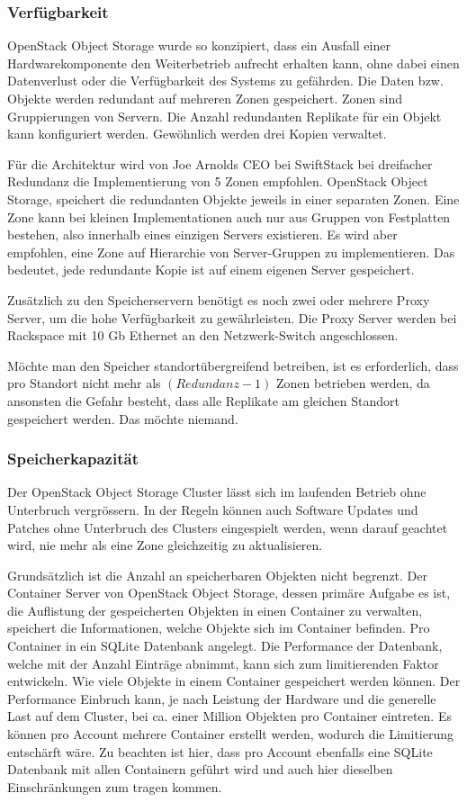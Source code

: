 \subsubsection*{Verfügbarkeit}
OpenStack Object Storage wurde so konzipiert, dass ein Ausfall einer Hardwarekomponente den Weiterbetrieb aufrecht erhalten kann, ohne dabei einen Datenverlust oder die Verfügbarkeit des Systems zu gefährden. Die Daten bzw. Objekte werden redundant auf mehreren Zonen gespeichert. Zonen sind Gruppierungen von Servern. Die Anzahl redundanten Replikate für ein Objekt kann konfiguriert werden. Gewöhnlich werden drei Kopien verwaltet.

Für die Architektur wird von Joe Arnolds CEO bei SwiftStack bei dreifacher Redundanz die Implementierung von 5 Zonen empfohlen. OpenStack Object Storage, speichert die redundanten Objekte jeweils in einer separaten Zonen. Eine Zone kann bei kleinen Implementationen auch nur aus Gruppen von Festplatten bestehen, also innerhalb eines einzigen Servers existieren. Es wird aber empfohlen, eine Zone auf Hierarchie von Server-Gruppen zu implementieren. Das bedeutet, jede redundante Kopie ist auf einem eigenen Server gespeichert. \cite{Arnold} 

Zusätzlich zu den Speicherservern benötigt es noch zwei oder mehrere Proxy Server, um die hohe Verfügbarkeit zu gewährleisten. Die Proxy Server werden bei Rackspace mit 10 Gb Ethernet an den Netzwerk-Switch angeschlossen. \cite{OpenStack2011}

Möchte man den Speicher standortübergreifend betreiben, ist es erforderlich, dass pro Standort nicht mehr als $(Redundanz -1)$ Zonen betrieben werden, da ansonsten die Gefahr besteht, dass alle Replikate am gleichen Standort gespeichert werden. Das möchte niemand.

\subsubsection*{Speicherkapazität}
Der OpenStack Object Storage Cluster lässt sich im laufenden Betrieb ohne Unterbruch vergrössern. In der Regeln können auch Software Updates und Patches ohne Unterbruch des Clusters eingespielt werden, wenn darauf geachtet wird, nie mehr als eine Zone gleichzeitig zu aktualisieren.

Grundsätzlich ist die Anzahl an speicherbaren Objekten nicht begrenzt. Der Container Server von OpenStack Object Storage, dessen primäre Aufgabe es ist, die Auflistung der gespeicherten Objekten in einen Container zu verwalten, speichert die Informationen, welche Objekte sich im Container befinden. Pro Container in ein SQLite Datenbank angelegt. Die Performance der Datenbank, welche mit der Anzahl Einträge abnimmt, kann sich zum limitierenden Faktor entwickeln. Wie viele Objekte in einem Container gespeichert werden können. Der Performance Einbruch kann, je nach Leistung der Hardware und die generelle Last auf dem Cluster, bei ca. einer Million Objekten pro Container eintreten. Es können pro Account mehrere Container erstellt werden, wodurch die Limitierung entschärft wäre. Zu beachten ist hier, dass pro Account ebenfalls eine SQLite Datenbank mit allen Containern geführt wird und auch hier dieselben Einschränkungen zum tragen kommen. \cite{OpenStack2012}\cite{A2011}

